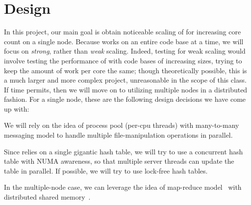 \section{Design}
\label{s:design}

In this project, our main
goal is obtain noticeable scaling of
\fakeroot for increasing
core count on a single node.
Because \make works on an entire code
base at a time, we will focus on
\textit{strong}, rather than \textit{weak} scaling.
Indeed, testing for weak scaling would involve
testing the performance of \make with code
bases of increasing sizes, trying to keep the amount
of work per core the same; though theoretically possible,
this is a much larger and more complex project,
unreasonable in the scope of this class.
If time permits, then we will
move on to utilizing multiple
nodes in a distributed fashion.
For a single node, these are the
following design decisions we
have come up with:
\squishlist
\item We will rely on the idea
of process pool (per-cpu threads)
with many-to-many messaging model to handle
multiple file-manipulation operations
in parallel.
\item Since \fakeroot relies on
a single gigantic hash table, we
will try to use a concurrent
hash table with NUMA awareness,
so that multiple server threads
can update the table in parallel.
If possible, we will try to use
lock-free hash tables.
\item In the multiple-node case,
we can leverage the idea of
map-reduce model~\cite{mapreduce}
with distributed shared memory~\cite{grappa}.
\squishend
